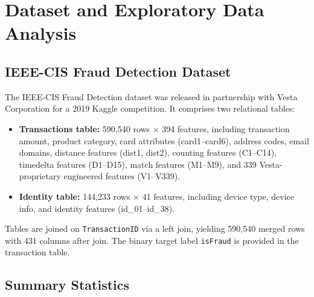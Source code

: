 ﻿%

\section{Dataset and Exploratory Data Analysis}
\label{sec:dataset}

\subsection{IEEE-CIS Fraud Detection Dataset}

The IEEE-CIS Fraud Detection dataset \citep{ieeecisFraud2019} was released
in partnership with Vesta Corporation for a 2019 Kaggle competition.
It comprises two relational tables:

\begin{itemize}
    \item \textbf{Transactions table:} 590,540 rows $\times$ 394 features,
          including transaction amount, product category, card attributes
          (card1--card6), address codes, email domains, distance features
          (dist1, dist2), counting features (C1--C14), timedelta features
          (D1--D15), match features (M1--M9), and 339 Vesta-proprietary
          engineered features (V1--V339).
    \item \textbf{Identity table:} 144,233 rows $\times$ 41 features,
          including device type, device info, and identity features
          (id\_01--id\_38).
\end{itemize}

Tables are joined on \texttt{TransactionID} via a left join, yielding
590,540 merged rows with 431 columns after join.
The binary target label \texttt{isFraud} is provided in the transaction table.

\subsection{Summary Statistics}

